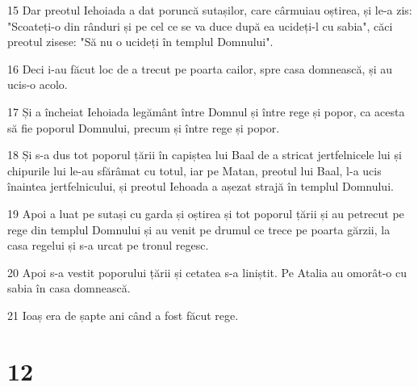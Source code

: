 \par 15 Dar preotul Iehoiada a dat poruncă sutașilor, care cârmuiau oștirea, și le-a zis: "Scoateți-o din rânduri și pe cel ce se va duce după ea ucideți-l cu sabia", căci preotul zisese: "Să nu o ucideți în templul Domnului".
\par 16 Deci i-au făcut loc de a trecut pe poarta cailor, spre casa domnească, și au ucis-o acolo.
\par 17 Și a încheiat Iehoiada legământ între Domnul și între rege și popor, ca acesta să fie poporul Domnului, precum și între rege și popor.
\par 18 Și s-a dus tot poporul țării în capiștea lui Baal de a stricat jertfelnicele lui și chipurile lui le-au sfărâmat cu totul, iar pe Matan, preotul lui Baal, l-a ucis înaintea jertfelnicului, și preotul Iehoada a așezat strajă în templul Domnului.
\par 19 Apoi a luat pe sutași cu garda și oștirea și tot poporul țării și au petrecut pe rege din templul Domnului și au venit pe drumul ce trece pe poarta gărzii, la casa regelui și s-a urcat pe tronul regesc.
\par 20 Apoi s-a vestit poporului țării și cetatea s-a liniștit. Pe Atalia au omorât-o cu sabia în casa domnească.
\par 21 Ioaș era de șapte ani când a fost făcut rege.

\chapter{12}

